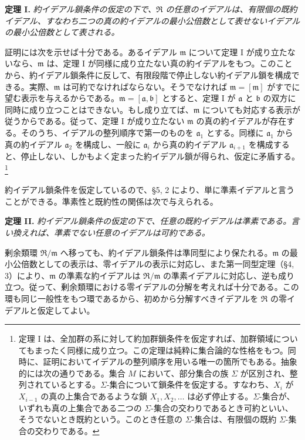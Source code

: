 \documentclass[11pt]{article}
\providecommand{\mR}{\mathfrak{R}}
\providecommand{\ma}{\mathfrak{a}}
\providecommand{\mb}{\mathfrak{b}}
\providecommand{\mm}{\mathfrak{m}}
\begin{document}
\textbf{定理 I.} \emph{約イデアル鎖条件の仮定の下で、$\mR$ の任意のイデアルは、有限個の既約イデアル、すなわち二つの真の約イデアルの最小公倍数として表せないイデアルの最小公倍数として表される。}

証明には次を示せば十分である。あるイデアル $\mm$ について定理 I が成り立たないなら、$\mm$ は、定理 I が同様に成り立たない真の約イデアルをもつ。このことから、約イデアル鎖条件に反して、有限段階で停止しない約イデアル鎖を構成できる。実際、$\mm$ は可約でなければならない。そうでなければ $\mm=[\mm]$ がすでに望む表示を与えるからである。$\mm=[\ma,\mb]$ とすると、定理 I が $\ma$ と $\mb$ の双方に同時に成り立つことはできない。もし成り立てば、$\mm$ についても対応する表示が従うからである。従って、定理 I が成り立たない $\mm$ の真の約イデアルが存在する。そのうち、イデアルの整列順序で第一のものを $\ma_1$ とする。同様に $\ma_1$ から真の約イデアル $\ma_2$ を構成し、一般に $\ma_i$ から真の約イデアル $\ma_{i+1}$ を構成すると、停止しない、しかもよく定まった約イデアル鎖が得られ、仮定に矛盾する。
\footnote{定理 I は、全加群の系に対して約加群鎖条件を仮定すれば、加群領域についてもまったく同様に成り立つ。この定理は純粋に集合論的な性格をもつ。同時に、証明においてイデアルの整列順序を用いる唯一の箇所でもある。抽象的には次の通りである。集合 $M$ において、部分集合の族 $\Sigma$ が区別され、整列されているとする。$\Sigma$-集合について鎖条件を仮定する。すなわち、$X_i$ が $X_{i-1}$ の真の上集合であるような鎖 $X_1,X_2,\ldots$ は必ず停止する。$\Sigma$-集合が、いずれも真の上集合である二つの $\Sigma$-集合の交わりであるとき可約といい、そうでないとき既約という。このとき任意の $\Sigma$-集合は、有限個の既約 $\Sigma$-集合の交わりである。}

約イデアル鎖条件を仮定しているので、§5, 2 により、単に準素イデアルと言うことができる。準素性と既約性の関係は次で与えられる。

\textbf{定理 II.} \emph{約イデアル鎖条件の仮定の下で、任意の既約イデアルは準素である。言い換えれば、準素でない任意のイデアルは可約である。}

剰余類環 $\mR/\mm$ へ移っても、約イデアル鎖条件は準同型により保たれる。$\mm$ の最小公倍数としての表示は、零イデアルの表示に対応し、また第一同型定理（§4, 3）により、$\mm$ の準素な約イデアルは $\mR/\mm$ の準素イデアルに対応し、逆も成り立つ。従って、剰余類環における零イデアルの分解を考えれば十分である。この環も同じ一般性をもつ環であるから、初めから分解すべきイデアルを $\mR$ の零イデアルと仮定してよい。
\end{document}
